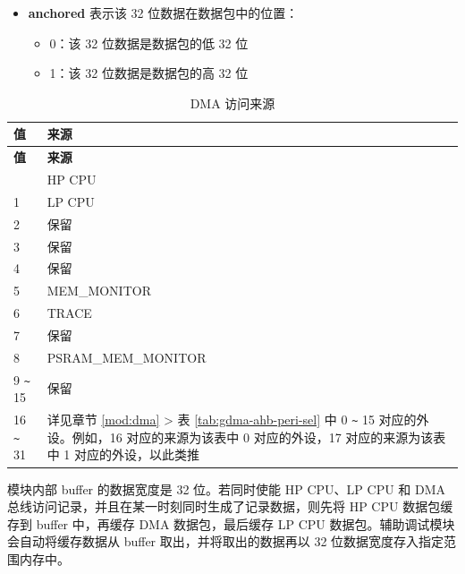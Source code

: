 \documentclass[main\_\_CN.tex]{subfiles}
\begin{document}
\begin{itemize}
\begin{itemize}
\begin{itemize}
            \item 1：舍弃了 DMA 数据包
        \end{itemize}
        \item Bit[6]：
        \begin{itemize}
            \item 0：未舍弃 LP CPU 数据包
            \item 1：舍弃了 LP CPU 数据包
        \end{itemize}
    \end{itemize}
    \item \textbf{anchored} 表示该 32 位数据在数据包中的位置：
    \begin{itemize}
        \item 0：该 32 位数据是数据包的低 32 位
        \item 1：该 32 位数据是数据包的高 32 位
    \end{itemize}
\end{itemize}

\begin{longtable}{|l| m{8cm} |}
    \caption{DMA 访问来源}\label{tab:assistdbg-dma-source}
    \\\hline
    \rowcolor{lightgray}
    \textbf{值} & \textbf{来源} \\\hline
    \endfirsthead \hline \rowcolor{lightgray}
    \textbf{值} & \textbf{来源} \\\hline
    \endhead \endfoot \hline \endlastfoot
    0 & HP CPU \\\hline
    1 & LP CPU \\\hline
    2 & 保留 \\\hline
    3 & 保留 \\\hline
    4 & 保留 \\\hline
    5 & MEM\_MONITOR \\\hline
    6 & TRACE \\\hline 
    7 & 保留 \\\hline
    8 & PSRAM\_MEM\_MONITOR \\\hline
    9 \verb+~+ 15 & 保留 \\\hline
    16 \verb+~+ 31 & 详见章节 \ref{mod:dma} \textit{\nameref{mod:dma}} > 表 \ref{tab:gdma-ahb-peri-sel} 中 0 \verb+~+ 15 对应的外设。例如，16 对应的来源为该表中 0 对应的外设，17 对应的来源为该表中 1 对应的外设，以此类推 \\\hline
\end{longtable}

模块内部 buffer 的数据宽度是 32 位。若同时使能 HP CPU、LP CPU 和 DMA 总线访问记录，并且在某一时刻同时生成了记录数据，则先将 HP CPU 数据包缓存到 buffer 中，再缓存 DMA 数据包，最后缓存 LP CPU 数据包。辅助调试模块会自动将缓存数据从 buffer 取出，并将取出的数据再以 32 位数据宽度存入指定范围内存中。
\end{document}
